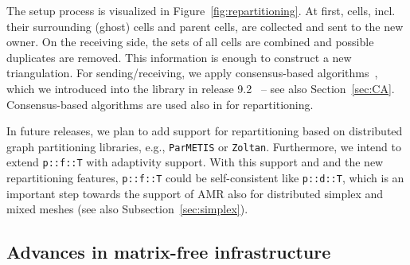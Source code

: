 \documentclass{ansarticle-preprint}
\begin{document}
The setup process is visualized in Figure~\ref{fig:repartitioning}. At first, cells, incl. their
surrounding (ghost) cells and parent cells, are collected and 
sent to the new owner. On the
receiving side, the sets of all cells are combined and possible duplicates
are removed. This information is enough to construct a new triangulation.
For sending/receiving, we apply consensus-based algorithms~\cite{hoefler2010scalable}, which
we introduced into the library in release 9.2~\cite{dealII92} -- see
also Section~\ref{sec:CA}. Consensus-based
algorithms are used also in \cite{ibanez2016pumi} for repartitioning.

In future releases, we plan to add support for repartitioning based on distributed graph
partitioning libraries, e.g., \texttt{ParMETIS} or \texttt{Zoltan}. Furthermore, we intend to extend 
\texttt{p::f::T} with adaptivity support.
With this support and and the new repartitioning features, \texttt{p::f::T}
could be self-consistent like \texttt{p::d::T}, which is an important
step towards the support of AMR also for distributed simplex and mixed meshes
(see also Subsection~\ref{sec:simplex}).


\subsection{Advances in matrix-free infrastructure}\label{sec:mf}
\end{document}
